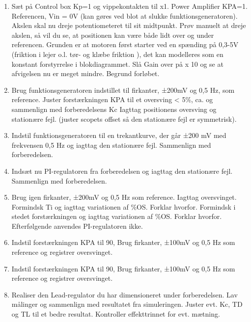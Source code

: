 \documentclass[]{report}
\begin{document}
\begin{enumerate}
	\item Sæt på Control box Kp=1 og vippekontakten til x1. 
	Power Amplifier KPA=1.  Referencen, Vin = 0V (kan gøres ved blot at slukke funktionsgeneratoren).  Akslen skal nu dreje potentiometeret til sit midtpunkt.
	Prøv manuelt at dreje akslen, så vil du se, at positionen kan være både lidt over og under referencen. Grunden er at motoren først starter ved en spænding på 0,3-5V (friktion i lejer o.l. tør- og klæbe friktion ), det kan modelleres som en konstant forstyrrelse i blokdiagrammet.
	Slå Gain over på  x 10 og se at afvigelsen nu er meget mindre. Begrund forløbet.\\
	\item Brug funktionsgeneratoren indstillet til firkanter, ±200mV og 0,5 Hz, som reference.
	Juster forstærkningen KPA til et oversving < 5\%, ca. og sammenlign med forberedelsens Kc
	Iagttag positionens oversving og stationære fejl.
	(juster scopets offset så den stationære fejl er symmetrisk).\\
	\item Indstil funktionsgeneratoren til en trekantkurve, der går ±200 mV med frekvensen 0,5 Hz og iagttag den stationære fejl. Sammenlign med forberedelsen.\\
	\item Indsæt nu PI-regulatoren fra forberedelsen og iagttag den stationære fejl. Sammenlign med forberedelsen.\\
	\item Brug igen firkanter, ±200mV og 0,5 Hz som reference. Iagttag oversvinget.
	Formindsk Ti og iagttag variationen af \%OS. Forklar hvorfor.
	Formindsk i stedet forstærkningen og iagttag variationen af \%OS. Forklar hvorfor.\\
	\newline Efterfølgende anvendes PI-regulatoren ikke.\\
	\item Indstil forstærkningen KPA til 90, Brug firkanter, ±100mV og 0,5 Hz som reference og registrer oversvinget.\\
	\item Indstil forstærkningen KPA til 90, Brug firkanter, ±100mV og 0,5 Hz som reference og registrer oversvinget.\\
	\item Realiser den Lead-regulator du har dimensioneret under forberedelsen. Lav målinger og sammenlign med resultatet fra simuleringen. Juster evt. Kc, TD og TL til et bedre resultat.
	Kontroller effekttrinnet for evt. mætning.
\end{enumerate}
\end{document}
